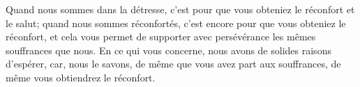 Quand nous sommes dans la détresse,
	c’est pour que vous obteniez le réconfort et le salut;
	quand nous sommes réconfortés,
	c’est encore pour que vous obteniez le réconfort,
	et cela vous permet de supporter avec persévérance
		les mêmes souffrances que nous.
En ce qui vous concerne, nous avons de solides raisons d’espérer,
	car, nous le savons, de même que vous avez part aux souffrances,
	de même vous obtiendrez le réconfort.

